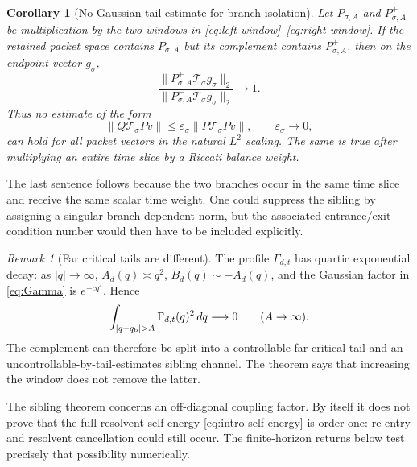 \documentclass[11pt]{article}
\newtheorem{corollary}[theorem]{Corollary}
\theoremstyle{definition}
\theoremstyle{remark}
\newtheorem{remark}[theorem]{Remark}
\newcommand{\cT}{\mathcal T}
\begin{document}
\begin{corollary}[No Gaussian-tail estimate for branch isolation]
\label{cor:no-tail}
Let $P^-_{\sigma,A}$ and $P^+_{\sigma,A}$ be multiplication by the two
windows in \eqref{eq:left-window}--\eqref{eq:right-window}.  If the retained
packet space contains $P^-_{\sigma,A}$ but its complement contains
$P^+_{\sigma,A}$, then on the endpoint vector $g_\sigma$,
\begin{equation}\label{eq:offblock-test}
 \frac{\|P^+_{\sigma,A}\cT_\sigma g_\sigma\|_2}
 {\|P^-_{\sigma,A}\cT_\sigma g_\sigma\|_2}
 \longrightarrow1.
\end{equation}
Thus no estimate of the form
\begin{equation}\label{eq:false-smallness}
 \|Q\cT_\sigma P v\|
 \le\varepsilon_\sigma\|P\cT_\sigma Pv\|,
 \qquad \varepsilon_\sigma\to0,
\end{equation}
can hold for all packet vectors in the natural $L^2$ scaling.  The same is
true after multiplying an entire time slice by a Riccati balance weight.
\end{corollary}

The last sentence follows because the two branches occur in the same time
slice and receive the same scalar time weight.  One could suppress the
sibling by assigning a singular branch-dependent norm, but the associated
entrance/exit condition number would then have to be included explicitly.

\begin{remark}[Far critical tails are different]
\label{rem:far-tail}
The profile $\Gamma_{d,t}$ has quartic exponential decay: as
$|q|\to\infty$, $A_d(q)\asymp q^2$, $B_d(q)\sim-A_d(q)$, and the Gaussian
factor in \eqref{eq:Gamma} is $e^{-c q^4}$.  Hence
\begin{equation}\label{eq:profile-tail}
 \int_{|q-q_{\rm b}|>A}\Gamma_{d,t}(q)^2\,dq\longrightarrow0
 \qquad(A\to\infty).
\end{equation}
The complement can therefore be split into a controllable far critical tail
and an uncontrollable-by-tail-estimates sibling channel.  The theorem says
that increasing the window does not remove the latter.
\end{remark}

The sibling theorem concerns an off-diagonal coupling factor.  By itself it
does not prove that the full resolvent self-energy
\eqref{eq:intro-self-energy} is order one: re-entry and resolvent cancellation
could still occur.  The finite-horizon returns below test precisely that
possibility numerically.
\end{document}
